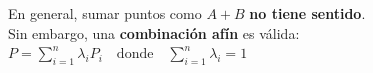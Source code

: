 \documentclass[preview]{standalone}
\begin{document}
\begin{center}
En general, sumar puntos como $A + B$ \textbf{no tiene sentido}.\\ Sin embargo, una \textbf{combinación afín} es válida:\\$P = \sum_{i=1}^n \lambda_i P_i \quad \text{donde} \quad \sum_{i=1}^n \lambda_i = 1$
\end{center}
\end{document}

